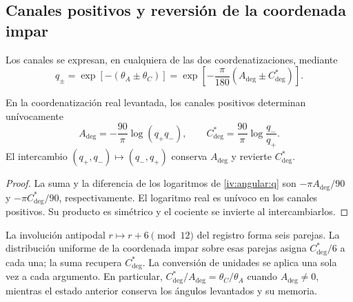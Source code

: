 \subsection{Canales positivos y reversión de la coordenada impar}
\label{iv:angular:canales}

Los canales se expresan, en cualquiera de las dos coordenatizaciones, mediante
\begin{equation}
 q_\pm=\exp[-(\theta_A\pm\theta_C)]
 =\exp\!\left[-\frac{\pi}{180}
                   (A_{\deg}\pm C^*_{\deg})\right].
 \label{iv:angular:q}
\end{equation}

\begin{proposition}
\label{iv:angular:inversion}
En la coordenatización real levantada, los canales positivos determinan
unívocamente
\begin{equation}
 A_{\deg}=-\frac{90}{\pi}\log(q_+q_-),\qquad
 C^*_{\deg}=\frac{90}{\pi}\log\frac{q_-}{q_+}.
 \label{iv:angular:recuperacion}
\end{equation}
El intercambio \((q_+,q_-)\mapsto(q_-,q_+)\) conserva
\(A_{\deg}\) y revierte \(C^*_{\deg}\).
\end{proposition}
\begin{proof}
La suma y la diferencia de los logaritmos de
\eqref{iv:angular:q} son \(-\pi A_{\deg}/90\) y
\(-\pi C^*_{\deg}/90\), respectivamente. El logaritmo real
es unívoco en los canales positivos. Su producto es simétrico
y el cociente se invierte al intercambiarlos.
\end{proof}

La involución antipodal \(r\mapsto r+6\pmod {12}\) del
registro forma seis parejas. La distribución uniforme de la
coordenada impar sobre esas parejas asigna
\(C^*_{\deg}/6\) a cada una; la suma recupera
\(C^*_{\deg}\). La conversión de unidades se aplica una
sola vez a cada argumento. En particular,
\(C^*_{\deg}/A_{\deg}=\theta_C/\theta_A\) cuando
\(A_{\deg}\ne0\), mientras el estado anterior conserva
los ángulos levantados y su memoria.
